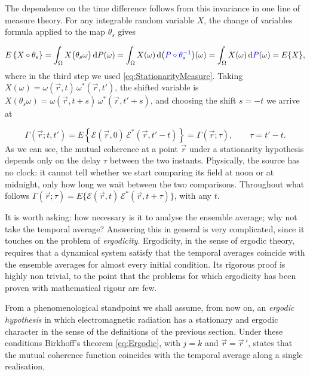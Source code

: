 	The dependence on the time difference follows from this invariance in one line of
	measure theory. For any integrable random variable $X$, the change of variables formula
	applied to the map $\theta_{s}$ gives

	\begin{equation}
		E\left\{X\circ\theta_{s}\right\} = \int_{\Omega}X\big(\theta_{s}\omega\big)\,\mathrm{d}P(\omega)
		= \int_{\Omega}X(\omega)\,\mathrm{d}\big(\textcolor{blue}{P\circ\theta_{s}^{-1}}\big)(\omega)
		= \int_{\Omega}X(\omega)\,\mathrm{d}\textcolor{blue}{P}(\omega) = E\{X\},
	\end{equation}
	where in the third step we used \eqref{eq:StationarityMeasure}. Taking
	$X(\omega) = \omega(\vec{r},t)\,\omega^{*}(\vec{r},t')$, the shifted variable is
	$X(\theta_{s}\omega) = \omega(\vec{r},t+s)\,\omega^{*}(\vec{r},t'+s)$, and choosing the
	shift $s=-t$ we arrive at

	\begin{equation}\label{eq:GammaTau}
		\Gamma(\vec{r};t,t') = E\left\{\mathcal{E}(\vec{r},0)\,\mathcal{E}^{*}(\vec{r},t'-t)\right\}
		= \Gamma(\vec{r};\tau), \qquad \tau = t'-t .
	\end{equation}
	As we can see, the mutual coherence at a point $\vec{r}$ under a stationarity hypothesis
	depends only on the delay $\tau$ between the two instants. Physically, the source has no
	clock: it cannot tell whether we start comparing its field at noon or at midnight, only
	how long we wait between the two comparisons. Throughout what follows
	$\Gamma(\vec{r};\tau) = E\{\mathcal{E}(\vec{r},t)\,\mathcal{E}^{*}(\vec{r},t+\tau)\}$, with
	any $t$.

	It is worth asking: how necessary is it to analyse the ensemble average; why not take the
	temporal average? Answering this in general is very complicated, since it touches on the
	problem of \textit{ergodicity}. Ergodicity, in the sense of ergodic theory, requires that
	a dynamical system satisfy that the temporal averages coincide with the ensemble averages
	for almost every initial condition. Its rigorous proof is highly non trivial, to the point
	that the problems for which ergodicity has been proven with mathematical rigour are few.

	From a phenomenological standpoint we shall assume, from now on, an \textit{ergodic
	hypothesis} in which electromagnetic radiation has a stationary and ergodic character in
	the sense of the definitions of the previous section. Under these conditions Birkhoff's
	theorem \eqref{eq:Ergodic}, with $j=k$ and $\vec{r}=\vec{r}\,'$, states that the mutual
	coherence function coincides with the temporal average along a single realisation,

